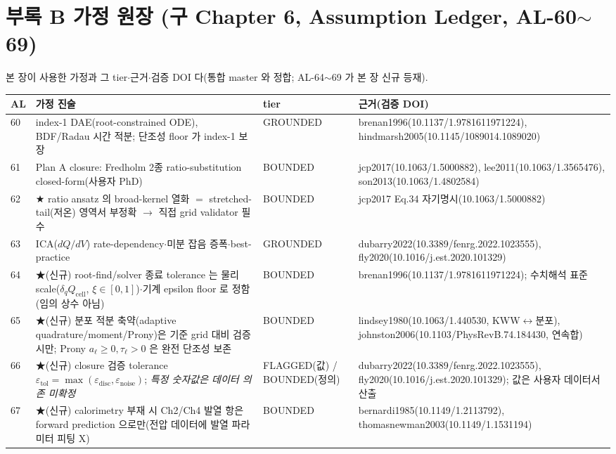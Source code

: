 \documentclass[11pt,a4paper]{article}
\newcommand{\cell}{\mathrm{cell}}
\newcommand{\tol}{\mathrm{tol}}
\newcommand{\noise}{\mathrm{noise}}
\newcommand{\brk}{\discretionary{}{}{}}%
\begin{document}
\section{부록 B 가정 원장 (구 Chapter 6, Assumption Ledger, AL-60$\sim$69)}\label{sec:ch6_al}
본 장이 사용한 가정과 그 tier$\cdot$근거$\cdot$검증 DOI 다(통합 master 와 정합; AL-64$\sim$69 가 본 장 신규 등재).
{\small
\begin{longtable}{p{} p{} p{} p{}}
\toprule AL & 가정 진술 & tier & 근거(검증 DOI) \\ \midrule \endhead
60 & index-1 DAE(root-constrained ODE), BDF/Radau 시간 적분; 단조성 floor 가 index-1 보장 & GROUNDED & brenan1996(10.1137/\brk 1.9781611971224), hindmarsh2005(10.1145/\brk 1089014.1089020) \\
61 & Plan A closure: Fredholm 2종 ratio-substitution closed-form(사용자 PhD) & BOUNDED & jcp2017(10.1063/\brk 1.5000882), lee2011(10.1063/\brk 1.3565476), son2013(10.1063/\brk 1.4802584) \\
62 & ★ ratio ansatz 의 broad-kernel 열화 $=$ stretched-tail(저온) 영역서 부정확 $\to$ 직접 grid validator 필수 & BOUNDED & jcp2017 Eq.34 자기명시(10.1063/\brk 1.5000882) \\
63 & ICA($dQ/dV$) rate-dependency$\cdot$미분 잡음 증폭$\cdot$best-practice & GROUNDED & dubarry2022(10.3389/\brk fenrg.2022.1023555), fly2020(10.1016/\brk j.est.2020.101329) \\
64 & ★(신규) root-find/solver 종료 tolerance 는 물리 scale($\delta_q Q_\cell$, $\xi\in[0,1]$)$\cdot$기계 epsilon floor 로 정함(임의 상수 아님) & BOUNDED & brenan1996(10.1137/\brk 1.9781611971224); 수치해석 표준 \\
65 & ★(신규) 분포 적분 축약(adaptive quadrature/moment/Prony)은 기준 grid 대비 검증 시만; Prony $a_\ell\ge0,\tau_\ell>0$ 은 완전 단조성 보존 & BOUNDED & lindsey1980(10.1063/\brk 1.440530, KWW$\leftrightarrow$분포), johnston2006(10.1103/\brk PhysRevB.74.184430, 연속합) \\
66 & ★(신규) closure 검증 tolerance $\varepsilon_\tol=\max(\varepsilon_{\mathrm{disc}},\varepsilon_\noise)$; \emph{특정 숫자값은 데이터 의존 미확정} & FLAGGED(값) / BOUNDED(정의) & dubarry2022(10.3389/\brk fenrg.2022.1023555), fly2020(10.1016/\brk j.est.2020.101329); 값은 사용자 데이터서 산출 \\
67 & ★(신규) calorimetry 부재 시 Ch2/Ch4 발열 항은 forward prediction 으로만(전압 데이터에 발열 파라미터 피팅 X) & BOUNDED & bernardi1985(10.1149/\brk 1.2113792), thomasnewman2003(10.1149/\brk 1.1531194) \\

\end{longtable}}
\end{document}
